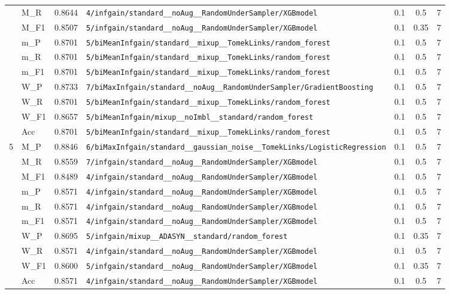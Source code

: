 \begin{table}[htbp]
\begin{tabular}{|c|l|c|>{\ttfamily\footnotesize}p{7.2cm}|c|c|c|}
 & M\_R & 0.8644 & \texttt{4/infgain/standard\_\_noAug\_\_RandomUnderSampler/XGBmodel} & 0.1 & 0.5  & 7 \\ 
 & M\_F1 & 0.8507 & \texttt{5/infgain/standard\_\_noAug\_\_RandomUnderSampler/XGBmodel} & 0.1 & 0.35  & 7 \\ 
 & m\_P & 0.8701 & \texttt{5/biMeanInfgain/standard\_\_mixup\_\_TomekLinks/random\_forest} & 0.1 & 0.5  & 7 \\ 
 & m\_R & 0.8701 & \texttt{5/biMeanInfgain/standard\_\_mixup\_\_TomekLinks/random\_forest} & 0.1 & 0.5  & 7 \\ 
 & m\_F1 & 0.8701 & \texttt{5/biMeanInfgain/standard\_\_mixup\_\_TomekLinks/random\_forest} & 0.1 & 0.5  & 7 \\ 
 & W\_P & 0.8733 & \texttt{7/biMaxInfgain/standard\_\_noAug\_\_RandomUnderSampler/GradientBoosting} & 0.1 & 0.5  & 7 \\ 
 & W\_R & 0.8701 & \texttt{5/biMeanInfgain/standard\_\_mixup\_\_TomekLinks/random\_forest} & 0.1 & 0.5  & 7 \\ 
 & W\_F1 & 0.8657 & \texttt{5/biMeanInfgain/mixup\_\_noImbl\_\_standard/random\_forest} & 0.1 & 0.5  & 7 \\ 
 & Acc & 0.8701 & \texttt{5/biMeanInfgain/standard\_\_mixup\_\_TomekLinks/random\_forest} & 0.1 & 0.5  & 7 \\ 
\hline
\multirow{10}{*}{5} & M\_P & 0.8846 & \texttt{6/biMaxInfgain/standard\_\_gaussian\_noise\_\_TomekLinks/LogisticRegression} & 0.1 & 0.5  & 7 \\ 
 & M\_R & 0.8559 & \texttt{7/infgain/standard\_\_noAug\_\_RandomUnderSampler/XGBmodel} & 0.1 & 0.5  & 7 \\ 
 & M\_F1 & 0.8489 & \texttt{4/infgain/standard\_\_noAug\_\_RandomUnderSampler/XGBmodel} & 0.1 & 0.5  & 7 \\ 
 & m\_P & 0.8571 & \texttt{4/infgain/standard\_\_noAug\_\_RandomUnderSampler/XGBmodel} & 0.1 & 0.5  & 7 \\ 
 & m\_R & 0.8571 & \texttt{4/infgain/standard\_\_noAug\_\_RandomUnderSampler/XGBmodel} & 0.1 & 0.5  & 7 \\ 
 & m\_F1 & 0.8571 & \texttt{4/infgain/standard\_\_noAug\_\_RandomUnderSampler/XGBmodel} & 0.1 & 0.5  & 7 \\ 
 & W\_P & 0.8695 & \texttt{5/infgain/mixup\_\_ADASYN\_\_standard/random\_forest} & 0.1 & 0.35  & 7 \\ 
 & W\_R & 0.8571 & \texttt{4/infgain/standard\_\_noAug\_\_RandomUnderSampler/XGBmodel} & 0.1 & 0.5  & 7 \\ 
 & W\_F1 & 0.8600 & \texttt{5/infgain/standard\_\_noAug\_\_RandomUnderSampler/XGBmodel} & 0.1 & 0.35  & 7 \\ 
 & Acc & 0.8571 & \texttt{4/infgain/standard\_\_noAug\_\_RandomUnderSampler/XGBmodel} & 0.1 & 0.5  & 7 \\ 
\hline
\end{tabular}
\end{table}